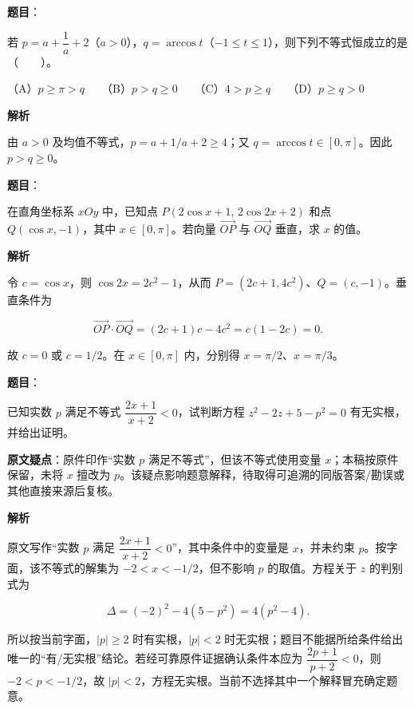 \begin{answer}

\textbf{题目}：

若 $p=a+\dfrac{1}{a}+2$（$a>0$），$q=\arccos t$（$-1\le t\le1$），则下列不等式恒成立的是\mbox{（　　）}。

（A）$p\ge\pi>q$　　（B）$p>q\ge0$　　（C）$4>p\ge q$　　（D）$p\ge q>0$

\textbf{解析}

由 $a>0$ 及均值不等式，$p=a+1/a+2\ge4$；又 $q=\arccos t\in[0,\pi]$。因此 $p>q\ge0$。


\end{answer}
\begin{answer}

\textbf{题目}：

在直角坐标系 $xOy$ 中，已知点 $P(2\cos x+1,\,2\cos 2x+2)$ 和点 $Q(\cos x,-1)$，其中 $x\in[0,\pi]$。若向量 $\overrightarrow{OP}$ 与 $\overrightarrow{OQ}$ 垂直，求 $x$ 的值。

\textbf{解析}

令 $c=\cos x$，则 $\cos2x=2c^2-1$，从而 $P=(2c+1,4c^2)$、$Q=(c,-1)$。垂直条件为

\nopagebreak[4]
\[\overrightarrow{OP}\cdot\overrightarrow{OQ}=(2c+1)c-4c^2=c(1-2c)=0.\]

故 $c=0$ 或 $c=1/2$。在 $x\in[0,\pi]$ 内，分别得 $x=\pi/2$、$x=\pi/3$。


\end{answer}
\begin{answer}

\textbf{题目}：

已知实数 $p$ 满足不等式 $\dfrac{2x+1}{x+2}<0$，试判断方程 $z^2-2z+5-p^2=0$ 有无实根，并给出证明。

\begin{gktip}
\textbf{原文疑点}：原件印作“实数 $p$ 满足不等式”，但该不等式使用变量 $x$；本稿按原件保留，未将 $x$ 擅改为 $p$。该疑点影响题意解释，待取得可追溯的同版答案/勘误或其他直接来源后复核。
\end{gktip}

\textbf{解析}

原文写作“实数 $p$ 满足 $\dfrac{2x+1}{x+2}<0$”，其中条件中的变量是 $x$，并未约束 $p$。按字面，该不等式的解集为 $-2<x<-1/2$，但不影响 $p$ 的取值。方程关于 $z$ 的判别式为

\nopagebreak[4]
\[\Delta=(-2)^2-4(5-p^2)=4(p^2-4).\]

所以按当前字面，$|p|\ge2$ 时有实根，$|p|<2$ 时无实根；题目不能据所给条件给出唯一的“有/无实根”结论。若经可靠原件证据确认条件本应为 $\dfrac{2p+1}{p+2}<0$，则 $-2<p<-1/2$，故 $|p|<2$，方程无实根。当前不选择其中一个解释冒充确定题意。


\end{answer}
